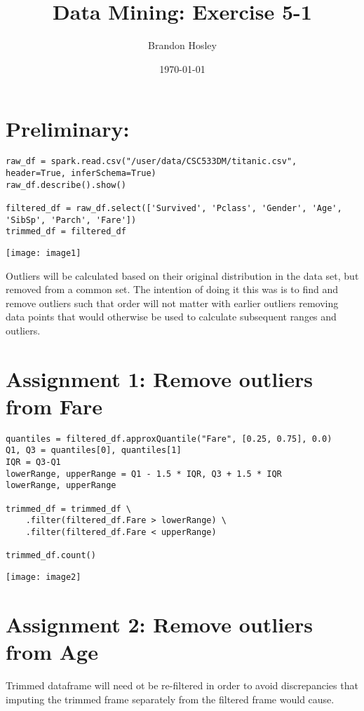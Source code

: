 \documentclass[]{article}
\title{Data Mining: Exercise 5-1}
\author{Brandon Hosley}
\date{\today}
\begin{document}
\maketitle

\section*{Preliminary: }

\begin{verbatim}
raw_df = spark.read.csv("/user/data/CSC533DM/titanic.csv", header=True, inferSchema=True)
raw_df.describe().show()

filtered_df = raw_df.select(['Survived', 'Pclass', 'Gender', 'Age', 'SibSp', 'Parch', 'Fare'])
trimmed_df = filtered_df
\end{verbatim}
\texttt{[image: image1]}

Outliers will be calculated based on their original distribution in the data set, but removed from a common set. The intention of doing it this was is to find and remove outliers such that order will not matter with earlier outliers removing data points that would otherwise be used to calculate subsequent ranges and outliers.

\section*{Assignment 1: Remove outliers from Fare}

\begin{verbatim}
quantiles = filtered_df.approxQuantile("Fare", [0.25, 0.75], 0.0)
Q1, Q3 = quantiles[0], quantiles[1]
IQR = Q3-Q1
lowerRange, upperRange = Q1 - 1.5 * IQR, Q3 + 1.5 * IQR
lowerRange, upperRange

trimmed_df = trimmed_df \
	.filter(filtered_df.Fare > lowerRange) \
	.filter(filtered_df.Fare < upperRange)

trimmed_df.count()
\end{verbatim}
\texttt{[image: image2]}


\section*{Assignment 2: Remove outliers from Age}

Trimmed dataframe will need ot be re-filtered in order to avoid discrepancies that imputing the trimmed frame separately from the filtered frame would cause.
\end{document}
